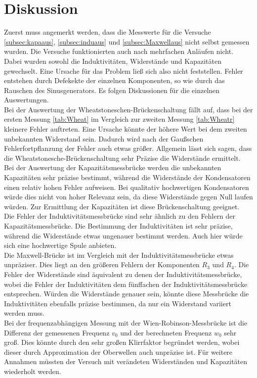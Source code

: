 \section{Diskussion}
\label{sec:Diskussion}
Zuerst muss angemerkt werden, dass die Messwerte für die Versuche \ref{subsec:kapaaus}, \ref{subsec:induaus} und \ref{subsec:Maxwellaus} nicht selbst gemessen wurden.
Die Versuche funktionierten auch nach mehrfachen Anläufen nicht. Dabei wurden sowohl die Induktivitäten, Widerstände und Kapazitäten gewechselt.
Eine Ursache für das Problem ließ sich also nicht feststellen.
Fehler entstehen durch Defekekte der einzelnen Komponenten, so wie durch das Rauschen des Sinusgenerators.
Es folgen Diskussionen für die einzelnen Auswertungen.\\
Bei der Auswertung der Wheatstoneschen-Brückenschaltung fällt auf, dass bei der ersten Messung \ref{tab:Wheat} 
im Vergleich zur zweiten Messung \ref{tab:Wheatr} kleinere Fehler auftreten.
Eine Ursache könnte der höhere Wert bei dem zweiten unbekannten Widerstand sein. Dadurch wird nach der Gaußschen Fehlerfortpflanzung
der Fehler auch etwas größer.
Allgemein lässt sich sagen, dass die Wheatstonesche-Brückenschaltung sehr Präzise die Widerstände ermittelt.\\
Bei der Auswertung der Kapazitätsmessbrücke werden die unbekannten Kapazitäten sehr präzise bestimmt, während die Widerstände der Kondensatoren einen relativ hohen Fehler aufweisen.
Bei qualitativ hochwertigen Kondensatoren würde dies nicht von hoher Relevanz sein, da diese Widerstände gegen Null laufen würden.
Zur Ermittlung der Kapazitäten ist diese Brückenschaltung geeignet. \\
Die Fehler der Induktivitätsmessbrücke sind sehr ähnlich zu den Fehlern der Kapazitätsmessbrücke.
Die Bestimmung der Induktivitäten ist sehr präzise, während die Widerstände etwas ungenauer bestimmt werden.
Auch hier würde sich eine hochwertige Spule anbieten.\\
Die Maxwell-Brücke ist im Vergleich mit der Induktivitätsmessbrücke etwas unpräziser.
Dies liegt an den größeren Fehlern der Komponenten $R_3$ und $R_4$. 
Die Fehler der Widerstände sind äquivalent zu denen der Induktivitätsmessbrücke, wobei die Fehler der Induktivitäten dem fünffachen der
Induktivitätsmessbrücke entsprechen. Würden die Widerstände genauer sein, könnte diese Messbrücke die Induktivitäten ebenfalls präzise bestimmen, 
da nur ein Widerstand variiert werden muss.\\
Bei der frequenzabhängigen Messung mit der Wien-Robinson-Messbrücke ist die Differenz der gemessenen Frequenz $v_0$ und der berechneten Frequenz $w_0$ sehr groß.
Dies könnte durch den sehr großen Klirrfaktor begründet werden, wobei dieser durch Approximation der Oberwellen auch unpräzise ist.
Für weitere Annahmen müssten der Versuch mit verändeten Widerständen und Kapazitäten wiederholt werden.

